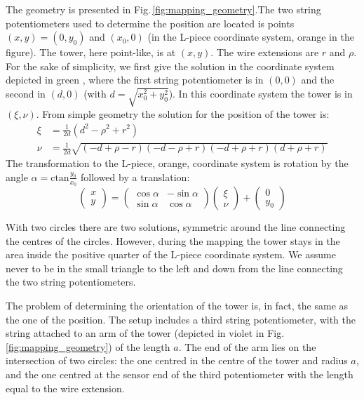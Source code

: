 The geometry is presented in Fig.\,\ref{fig:mapping_geometry}.The two string potentiometers used to determine the position are located is points $(x, y) = (0, y_0)$ and $(x_0, 0)$ (in the L-piece coordinate system, orange in the figure).
The tower, here point-like, is at $(x,y)$.
The wire extensions are $r$ and $\rho$. For the sake of simplicity, we first give the solution in the coordinate system depicted in green , where the first string potentiometer is in $(0,0)$ and the second in $(d, 0)$ (with $d = \sqrt{x_0^2 + y_0^2}$). In this coordinate system the tower is in $(\xi, \nu)$. From simple geometry the solution for the position of the tower is:
\begin{align}
  \xi & = \frac{1}{2d} \left( d^2 - \rho^2 + r^2 \right) \\
  \nu & = \frac{1}{2d} \sqrt{ (-d + \rho - r) (-d - \rho + r) (-d + \rho + r) (d + \rho + r) }
\end{align}
The transformation to the L-piece, orange, coordinate system is rotation by the angle $\alpha = \mathrm{ctan} \frac{y_0}{x_0}$ followed by a translation:
\begin{equation}
  \begin{pmatrix}
    x \\
    y
  \end{pmatrix}
  =
  \begin{pmatrix}
    \cos \alpha & -\sin \alpha \\
    \sin \alpha & \cos \alpha
  \end{pmatrix}
  \begin{pmatrix}
    \xi \\
    \nu
  \end{pmatrix}
  +
  \begin{pmatrix}
    0 \\
    y_0
  \end{pmatrix}
\end{equation}


With two circles there are two solutions, symmetric around the line connecting the centres of the circles. However, during the mapping the tower stays in the area inside the positive quarter of the L-piece coordinate system.
We assume never to be in the small triangle to the left and down from the line connecting the two string potentiometers.

The problem of determining the orientation of the tower is, in fact, the same as the one of the position. The setup includes a third string potentiometer, with the string attached to  an arm of the tower (depicted in violet in Fig.\,\ref{fig:mapping_geometry}) of the length $a$. The end of the arm lies on the intersection of two circles: the one centred in the centre of the tower and radius $a$, and the one centred at the sensor end of the third potentiometer with the length equal to the wire extension.



